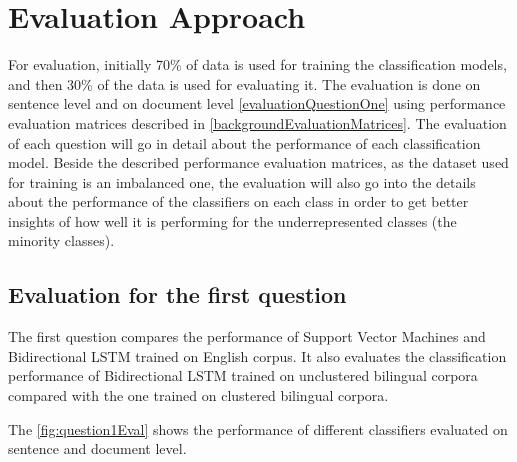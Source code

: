\section{Evaluation Approach}
For evaluation, initially 70\% of data is used for training the classification models, and then 30\% of the data is used for evaluating it. The evaluation is done on sentence level and on document level \ref{evaluationQuestionOne} using performance evaluation matrices described in \ref{backgroundEvaluationMatrices}. The evaluation of each question will go in detail about the performance of each classification model. Beside the described performance evaluation matrices, as the dataset used for training is an imbalanced one, the evaluation will also go into the details about the performance of the classifiers on each class in order to get better insights of how well it is performing for the underrepresented classes (the minority classes).


\subsection{Evaluation for the first question} \label{EvalQ1}

The first question compares the performance of Support Vector Machines and Bidirectional LSTM trained on English corpus. It also evaluates the classification performance of Bidirectional LSTM trained on unclustered bilingual corpora compared with the one trained on clustered bilingual corpora.  

The \ref{fig:question1Eval} shows the performance of different classifiers evaluated on sentence and document level.

